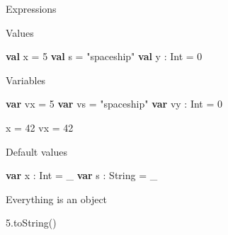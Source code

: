 \documentclass[ignorenonframetext,]{beamer}
\newenvironment{Shaded}{\begin{snugshade}}{\end{snugshade}}
\newcommand{\KeywordTok}[1]{\textcolor[rgb]{0.13,0.29,0.53}{\textbf{#1}}}
\newcommand{\DecValTok}[1]{\textcolor[rgb]{0.00,0.00,0.81}{#1}}
\newcommand{\FloatTok}[1]{\textcolor[rgb]{0.00,0.00,0.81}{#1}}
\newcommand{\StringTok}[1]{\textcolor[rgb]{0.31,0.60,0.02}{#1}}
\newcommand{\FunctionTok}[1]{\textcolor[rgb]{0.00,0.00,0.00}{#1}}
\newcommand{\NormalTok}[1]{#1}
\begin{document}
\begin{frame}[fragile]
\begin{block}{Expressions}
\end{block}

\begin{block}{Values}

\begin{Shaded}
\begin{Highlighting}[]
\KeywordTok{val}\NormalTok{ x = }\DecValTok{5}
\KeywordTok{val}\NormalTok{ s = }\StringTok{"spaceship"}
\KeywordTok{val}\NormalTok{ y : Int = }\DecValTok{0}
\end{Highlighting}
\end{Shaded}

\end{block}

\begin{block}{Variables}

\begin{Shaded}
\begin{Highlighting}[]
\KeywordTok{var}\NormalTok{ vx = }\DecValTok{5}
\KeywordTok{var}\NormalTok{ vs = }\StringTok{"spaceship"}
\KeywordTok{var}\NormalTok{ vy : Int = }\DecValTok{0}
\end{Highlighting}
\end{Shaded}

\begin{Shaded}
\begin{Highlighting}[]
\NormalTok{x = }\DecValTok{42}
\NormalTok{vx = }\DecValTok{42}
\end{Highlighting}
\end{Shaded}

\end{block}

\begin{block}{Default values}

\begin{Shaded}
\begin{Highlighting}[]
\KeywordTok{var}\NormalTok{ x : Int = _}
\KeywordTok{var}\NormalTok{ s : String = _}
\end{Highlighting}
\end{Shaded}

\end{block}

\begin{block}{Everything is an object}

\begin{Shaded}
\begin{Highlighting}[]
\FloatTok{5.}\FunctionTok{toString}\NormalTok{()}
\end{Highlighting}
\end{Shaded}


\end{block}
\end{frame}
\end{document}
